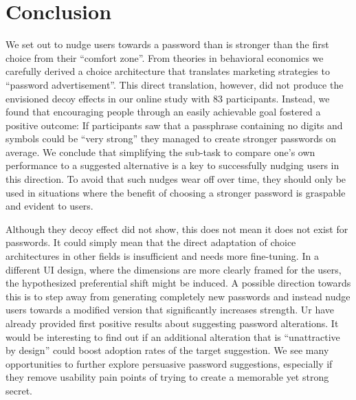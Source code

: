 \section{Conclusion}
We set out to nudge users towards a password than is stronger than the first choice from their ``comfort zone''. From theories in behavioral economics we carefully derived a choice architecture that translates marketing strategies to ``password advertisement''. This direct translation, however, did not produce the envisioned decoy effects in our online study with 83 participants. Instead, we found that encouraging people through an easily achievable goal fostered a positive outcome: If participants saw that a passphrase containing no digits and symbols could be ``very strong'' they managed to create stronger passwords on average. We conclude that simplifying the sub-task to compare one's own performance to a suggested alternative is a key to successfully nudging users in this direction. To avoid that such nudges wear off over time, they should only be used in situations where the benefit of choosing a stronger password is graspable and evident to users. 

Although they decoy effect did not show, this does not mean it does not exist for passwords. It could simply mean that the direct adaptation of choice architectures in other fields is insufficient and needs more fine-tuning. In a different UI design, where the dimensions are more clearly framed for the users, the hypothesized preferential shift might be induced. A possible direction towards this is to step away from generating completely new passwords and instead nudge users towards a modified version that significantly increases strength. Ur \etal have already provided first positive results about suggesting password alterations. It would be interesting to find out if an additional alteration that is ``unattractive by design'' could boost adoption rates of the target suggestion. We see many opportunities to further explore persuasive password suggestions, especially if they remove usability pain points of trying to create a memorable yet strong secret. 

